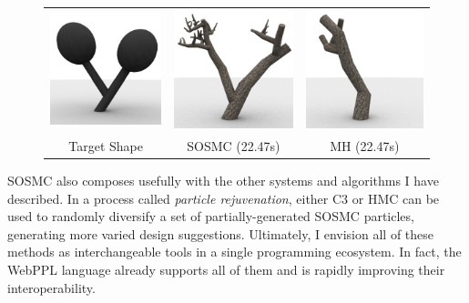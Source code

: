 \documentclass[
10pt, %
a4paper, %
oneside, %
headinclude,footinclude, %
BCOR5mm, %
]{scrartcl}
\newcommand*{\helvetica}{\fontfamily{phv}\selectfont}
\begin{document}
\vspace{1em}
\begin{figure}[h!]
	\centering
	\begin{tabular}{ccc}
		\includegraphics[width=0.30\linewidth]{figs/sosmc/target.png} &
		\includegraphics[width=0.30\linewidth]{figs/sosmc/sosmc.png} &
		\includegraphics[width=0.30\linewidth]{figs/sosmc/mh.png} \\
		{\helvetica \scriptsize{Target Shape}} & {\helvetica \scriptsize{SOSMC (22.47s)}} & {\helvetica \scriptsize{MH (22.47s)}}
	\end{tabular}
\end{figure}

SOSMC also composes usefully with the other systems and algorithms I have described. In a process called \emph{particle rejuvenation}, either C3 or HMC can be used to randomly diversify a set of partially-generated SOSMC particles, generating more varied design suggestions. Ultimately, I envision all of these methods as interchangeable tools in a single programming ecosystem. In fact, the WebPPL language already supports all of them and is rapidly improving their interoperability.


\end{document}
